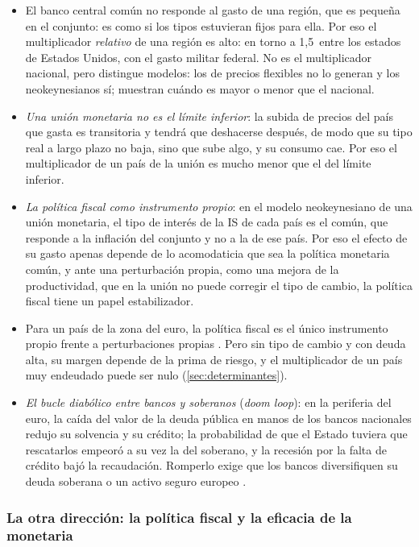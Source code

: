 \documentclass[11pt]{article}
\begin{document}
\begin{itemize}
\item El banco central común no responde al gasto de una región, que es pequeña en el conjunto: es como si los tipos estuvieran fijos para ella. Por eso el multiplicador \emph{relativo} de una región es alto: en torno a 1,5~entre los estados de Estados Unidos, con el gasto militar federal\nocite{NakamuraSteinsson2014}. No es el multiplicador nacional, pero distingue modelos: los de precios flexibles no lo generan y los neokeynesianos sí; \textcite{FarhiWerning2016} muestran cuándo es mayor o menor que el nacional.
\item \emph{Una unión monetaria no es el límite inferior}: la subida de precios del país que gasta es transitoria y tendrá que deshacerse después, de modo que su tipo real a largo plazo no baja, sino que sube algo, y su consumo cae\nocite{NakamuraSteinsson2014}. Por eso el multiplicador de un país de la unión es mucho menor que el del límite inferior.
\item \emph{La política fiscal como instrumento propio}: en el modelo neokeynesiano de una unión monetaria, el tipo de interés de la IS de cada país es el común, que responde a la inflación del conjunto y no a la de ese país. Por eso el efecto de su gasto apenas depende de lo acomodaticia que sea la política monetaria común, y ante una perturbación propia, como una mejora de la productividad, que en la unión no puede corregir el tipo de cambio, la política fiscal tiene un papel estabilizador\nocite{GaliMonacelli2008Optimal}.
\item Para un país de la zona del euro, la política fiscal es el único instrumento propio frente a perturbaciones propias . Pero sin tipo de cambio y con deuda alta, su margen depende de la prima de riesgo, y el multiplicador de un país muy endeudado puede ser nulo (\ref{sec:determinantes}).
\item \emph{El bucle diabólico entre bancos y soberanos} (\emph{doom loop}): en la periferia del euro, la caída del valor de la deuda pública en manos de los bancos nacionales redujo su solvencia y su crédito; la probabilidad de que el Estado tuviera que rescatarlos empeoró a su vez la del soberano, y la recesión por la falta de crédito bajó la recaudación\nocite{BrunnermeierEtAl2016Diabolic}. Romperlo exige que los bancos diversifiquen su deuda soberana o un activo seguro europeo .
\end{itemize}

\subsubsection{La otra dirección: la política fiscal y la eficacia de la monetaria}\label{sec:otra-direccion}
\end{document}

